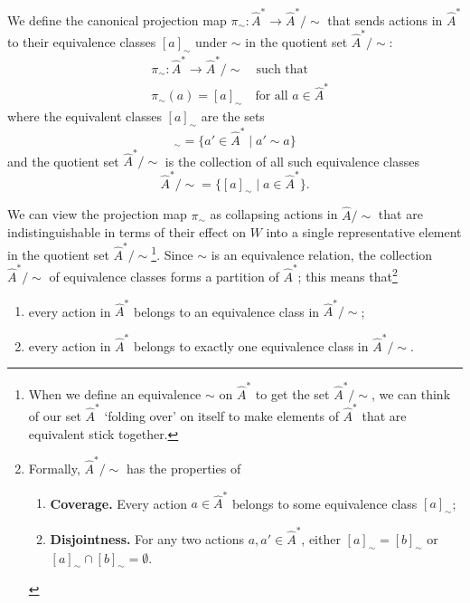 We define the canonical projection map $\pi_{\sim}: \hat{A}^{*} \to \hat{A}^{*}/\sim$ that sends actions in $\hat{A}^{*}$ to their equivalence classes $[a]_{\sim}$ under $\sim$ in the quotient set $\hat{A}^{*}/\sim$:
\begin{equation}
\begin{aligned}
    & \pi_{\sim}: \hat{A}^{*} \to \hat{A}^{*}/\sim \quad \text{such that} \\
    & \pi_{\sim}(a) = [a]_{\sim} \quad \text{for all $a \in \hat{A}^{*}$}
\end{aligned}
\end{equation}
where the equivalent classes $[a]_{\sim}$ are the sets
\begin{equation}
	[a]_{\sim} = \{ a' \in \hat{A}^{*} \mid a' \sim a \}
\end{equation}
and the quotient set $\hat{A}^{*}/\sim$ is the collection of all such equivalence classes
\begin{equation}
    \hat{A}^{*}/\sim = \{ [a]_{\sim} \mid a \in \hat{A}^{*} \}.
\end{equation}

We can view the projection map $\pi_{\sim}$ as collapsing actions in $\hat{A}/\sim$ that are indistinguishable in terms of their effect on $W$ into a single representative element in the quotient set $\hat{A}^{*}/\sim$\footnote{
    When we define an equivalence $\sim$ on $\hat{A}^{*}$ to get the set $\hat{A}^{*}/\sim$, we can think of our set $\hat{A}^{*}$ `folding over' on itself to make elements of $\hat{A}^{*}$ that are equivalent stick together.
}.
Since $\sim$ is an equivalence relation, the collection $\hat{A}^{*}/\sim$ of equivalence classes forms a partition of $\hat{A}^{*}$; this means that\footnote{
Formally, $\hat{A}^{*}/\sim$ has the properties of
\begin{enumerate}
    \item \textbf{Coverage.}
    Every action $a \in \hat{A}^{*}$ belongs to some equivalence class $[a]_{\sim}$;

    \item \textbf{Disjointness.}
    For any two actions $a, a' \in \hat{A}^{*}$, either $[a]_{\sim} = [b]_{\sim}$ or $[a]_{\sim} \cap [b]_{\sim} = \emptyset$.
\end{enumerate}
}
\begin{enumerate}
    \item every action in $\hat{A}^{*}$ belongs to an equivalence class in $\hat{A}^{*}/\sim$;
    \item every action in $\hat{A}^{*}$ belongs to exactly one equivalence class in $\hat{A}^{*}/\sim$.
\end{enumerate}

